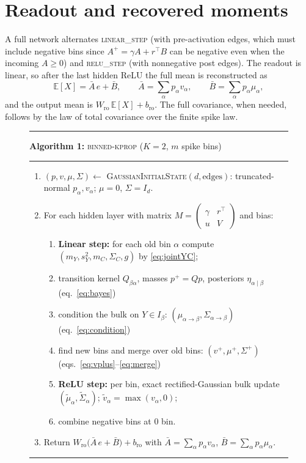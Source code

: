 \documentclass[11pt]{article}
\newcommand{\E}{\mathbb{E}}
\begin{document}
\section{Readout and recovered moments}

A full network alternates \textsc{linear\_step} (with pre-activation edges, which must include negative bins since $A^+ = \gamma A + r^\top B$ can be negative even when the incoming $A \ge 0$) and \textsc{relu\_step} (with nonnegative post edges). The readout is linear, so after the last hidden ReLU the full mean is reconstructed as
\begin{equation}
\E[X] = \bar A\, e + \bar B, \qquad
\bar A = \sum_\alpha p_\alpha v_\alpha, \qquad
\bar B = \sum_\alpha p_\alpha \mu_\alpha,
\end{equation}
and the output mean is $W_{\mathrm{ro}}\, \E[X] + b_{\mathrm{ro}}$. The full covariance, when needed, follows by the law of total covariance over the finite spike law.

\begin{figure}[t]
\hrule\vspace{5pt}
\noindent\textbf{Algorithm 1:} \textsc{binned-kprop} ($K = 2$, $m$ spike bins)
\vspace{4pt}\hrule\vspace{4pt}
\begin{enumerate}\setlength{\itemsep}{1pt}
\item $(p, v, \mu, \Sigma) \gets$ \textsc{GaussianInitialState}$(d, \text{edges})$: truncated-normal $p_\alpha, v_\alpha$; $\mu = 0$, $\Sigma = I_d$.
\item For each hidden layer with matrix $M = \begin{pmatrix} \gamma & r^\top \\ u & V \end{pmatrix}$ and bias:
  \begin{enumerate}\setlength{\itemsep}{1pt}
  \item \textbf{Linear step:} for each old bin $\alpha$ compute $(m_Y, s_Y^2, m_C, \Sigma_C, g)$ by \eqref{eq:jointYC};
  \item transition kernel $Q_{\beta\alpha}$, masses $p^+ = Qp$, posteriors $\eta_{\alpha\mid\beta}$ \hfill (eq.~\eqref{eq:bayes})
  \item condition the bulk on $Y \in I_\beta$: $(\mu_{\alpha\to\beta}, \Sigma_{\alpha\to\beta})$ \hfill (eq.~\eqref{eq:condition})
  \item find new bins and merge over old bins: $(v^+, \mu^+, \Sigma^+)$ \hfill (eqs.~\eqref{eq:vplus}--\eqref{eq:merge})
  \item \textbf{ReLU step:} per bin, exact rectified-Gaussian bulk update $(\tilde\mu_\alpha, \tilde\Sigma_\alpha)$; $\tilde v_\alpha = \max(v_\alpha, 0)$;
  \item combine negative bins at $0$ bin. 
  \end{enumerate}
\item Return $W_{\mathrm{ro}} \big( \bar A\, e + \bar B \big) + b_{\mathrm{ro}}$ with $\bar A = \sum_\alpha p_\alpha v_\alpha$, $\bar B = \sum_\alpha p_\alpha \mu_\alpha$.
\end{enumerate}
\vspace{2pt}\hrule
\end{figure}
\end{document}

